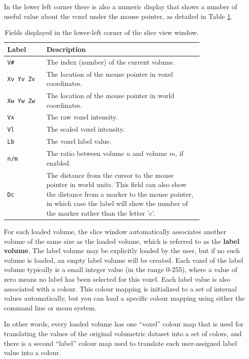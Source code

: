 \documentclass[11pt,letterpaper]{article}
\newcommand{\ident}[1]{{\tt #1}}
\begin{document}
In the lower left corner there is also a numeric display that shows a
number of useful value about the voxel under the mouse pointer, as
detailed in Table \ref{tabSliceFields}.
\begin{table}
\centering
\caption{Fields displayed in the lower-left corner of the slice view window.}
\begin{tabular}{lp{0.8\linewidth}}
Label & Description \\
\hline
\ident{V\#} & The index (number) of the current volume. \\
\ident{Xv Yv Zv} & The location of the mouse pointer in voxel coordinates. \\
\ident{Xw Yw Zw} & The location of the mouse pointer in world coordinates. \\
\ident{Vx} & The raw voxel intensity. \\
\ident{Vl} & The scaled voxel intensity. \\
\ident{Lb} & The voxel label value. \\
\ident{n/m} & The ratio between volume $n$ and volume $m$, if enabled. \\
\ident{Dc} & The distance from the cursor to the mouse pointer in world units. This field can also show the distance from a marker to the mouse pointer, in which case the label will show the number of the marker rather than the letter 'c'. \\
\hline
\end{tabular}
\label{tabSliceFields}
\end{table}

For each loaded volume, the slice window automatically associates
another volume of the same size as the loaded volume, which is
referred to as the {\bf label volume}. The label volume may be
explicitly loaded by the user, but if no such volume is loaded, an
empty label volume will be created. Each voxel of the label volume
typically is a small integer value (in the range 0-255), where a value
of zero means no label has been selected for this voxel. Each label
value is also associated with a colour. This colour mapping is
initialized to a set of internal values automatically, but you can
load a specific colour mapping using either the command line or menu
system.

In other words, every loaded volume has one ``voxel'' colour map that
is used for translating the values of the original volumetric dataset
into a set of colors, and there is a second ``label'' colour map used
to translate each user-assigned label value into a colour.
\end{document}
